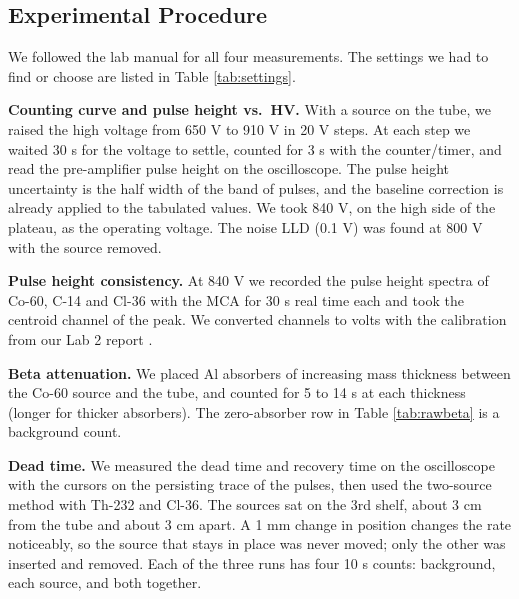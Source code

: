 \documentclass[12pt]{article}
\begin{document}
\subsection{Experimental Procedure}

We followed the lab manual \cite{labmanual} for all four measurements. The settings we had to find or choose are listed in Table \ref{tab:settings}.

\textbf{Counting curve and pulse height vs.\ HV.} With a source on the tube, we raised the high voltage from 650 V to 910 V in 20 V steps. At each step we waited 30 s for the voltage to settle, counted for 3 s with the counter/timer, and read the pre-amplifier pulse height on the oscilloscope. The pulse height uncertainty is the half width of the band of pulses, and the baseline correction is already applied to the tabulated values.  We took 840 V, on the high side of the plateau, as the operating voltage. The noise LLD (0.1 V) was found at 800 V with the source removed.

\textbf{Pulse height consistency.} At 840 V we recorded the pulse height spectra of Co-60, C-14 and Cl-36 with the MCA for 30 s real time each and took the centroid channel of the peak. We converted channels to volts with the calibration from our Lab 2 report \cite{lab2}.

\textbf{Beta attenuation.} We placed Al absorbers of increasing mass thickness between the Co-60 source and the tube, and counted for 5 to 14 s at each thickness (longer for thicker absorbers). The zero-absorber row in Table \ref{tab:rawbeta} is a background count.

\textbf{Dead time.} We measured the dead time and recovery time on the oscilloscope with the cursors on the persisting trace of the pulses, then used the two-source method with Th-232 and Cl-36. The sources sat on the 3rd shelf, about 3 cm from the tube and about 3 cm apart. A 1 mm change in position changes the rate noticeably, so the source that stays in place was never moved; only the other was inserted and removed. Each of the three runs has four 10 s counts: background, each source, and both together.
\end{document}
